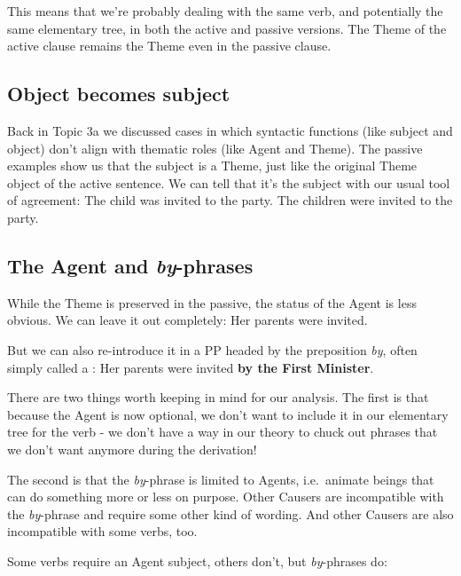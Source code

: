 \documentclass{article}
\begin{document}
This means that we're probably dealing with the same verb, and potentially the same elementary tree, in both the active and passive versions. The Theme of the active clause remains the Theme even in the passive clause.

    \subsection{Object becomes subject} %
Back in Topic 3a we discussed cases in which syntactic functions (like subject and object) don't align with thematic roles (like Agent and Theme). The passive examples show us that the subject is a Theme, just like the original Theme object of the active sentence. We can tell that it's the subject with our usual tool of agreement:
\ea
    \ea The child was invited to the party.
    \ex The children were invited to the party.
    \z
\z


    \subsection{The Agent and \emph{by}-phrases}
While the Theme is preserved in the passive, the status of the Agent is less obvious. We can leave it out completely:
\ea Her parents were invited.
\z

But we can also re-introduce it in a PP headed by the preposition \emph{by}, often simply called a :
\ea Her parents were invited \textbf{by the First Minister}.
\z

There are two things worth keeping in mind for our analysis. The first is that because the Agent is now optional, we don't want to include it in our elementary tree for the verb - we don't have a way in our theory to chuck out phrases that we don't want anymore during the derivation!

The second is that the \emph{by}-phrase is limited to Agents, i.e.~animate beings that can do something more or less on purpose. Other Causers are incompatible with the \emph{by}-phrase and require some other kind of wording. And other Causers are also incompatible with some verbs, too.

Some verbs require an Agent subject, others don't, but \emph{by}-phrases do:
\ea
    \z
\ex
    \z
\ex
    \z
\z
\end{document}
